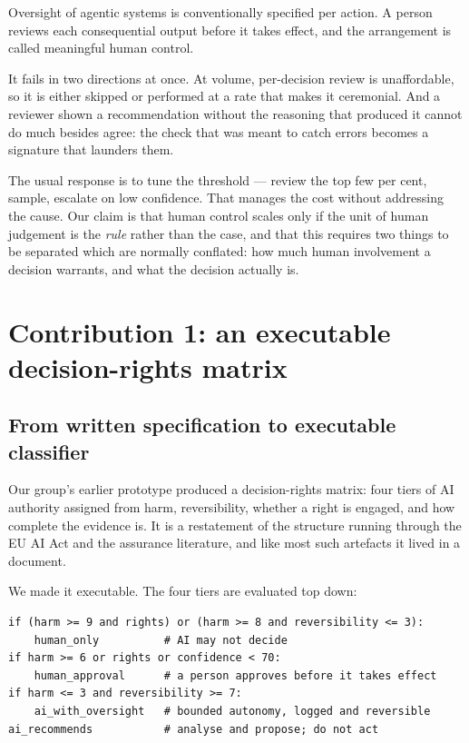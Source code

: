 \documentclass[sigconf,nonacm]{acmart}
\begin{document}
Oversight of agentic systems is conventionally specified per action. A person
reviews each consequential output before it takes effect, and the arrangement is
called meaningful human control.

It fails in two directions at once. At volume, per-decision review is
unaffordable, so it is either skipped or performed at a rate that makes it
ceremonial. And a reviewer shown a recommendation without the reasoning that
produced it cannot do much besides agree: the check that was meant to catch
errors becomes a signature that launders them.

The usual response is to tune the threshold --- review the top few per cent,
sample, escalate on low confidence. That manages the cost without addressing the
cause. Our claim is that human control scales only if the unit of human
judgement is the \emph{rule} rather than the case, and that this requires two
things to be separated which are normally conflated: how much human involvement
a decision warrants, and what the decision actually is.

\section{Contribution 1: an executable decision-rights matrix}

\subsection{From written specification to executable classifier}

Our group's earlier prototype produced a decision-rights matrix: four tiers of
AI authority assigned from harm, reversibility, whether a right is engaged, and
how complete the evidence is. It is a restatement of the structure running
through the EU AI Act and the assurance literature, and like most such artefacts
it lived in a document.

We made it executable. The four tiers are evaluated top down:

\begin{lstlisting}
if (harm >= 9 and rights) or (harm >= 8 and reversibility <= 3):
    human_only          # AI may not decide
if harm >= 6 or rights or confidence < 70:
    human_approval      # a person approves before it takes effect
if harm <= 3 and reversibility >= 7:
    ai_with_oversight   # bounded autonomy, logged and reversible
ai_recommends           # analyse and propose; do not act
\end{lstlisting}
\end{document}
